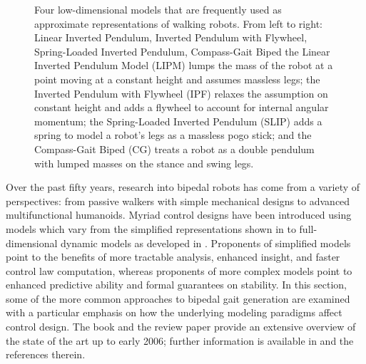 
\begin{figure}
  \centering
  \def\svgwidth{1.0\columnwidth}
  
  \caption{Four low-dimensional models that are frequently used as approximate
    representations of walking robots. From left to right:
    Linear Inverted Pendulum, Inverted Pendulum with Flywheel, Spring-Loaded
    Inverted Pendulum, Compass-Gait Biped
    the Linear Inverted Pendulum Model (LIPM) lumps the mass of the robot at a
    point moving at a constant height and assumes massless legs;
    the Inverted Pendulum with Flywheel (IPF) relaxes the assumption on constant
    height and adds a flywheel to account for internal angular momentum;
    the Spring-Loaded Inverted Pendulum (SLIP) adds a spring to model a robot's
    legs as a massless pogo stick;
    and the Compass-Gait Biped (CG) treats a robot as a double pendulum with
    lumped masses on the stance and swing legs.}
  \label{fig:biped-models}
\end{figure}

Over the past fifty years, research into bipedal robots has come from a variety of perspectives: from passive walkers with simple mechanical designs to advanced multifunctional humanoids.
%
Myriad control designs have been introduced using models which vary from the simplified representations shown in  to full-dimensional dynamic models as developed in .
%
Proponents of simplified models point to the benefits of more tractable analysis, enhanced insight, and faster control law computation, whereas proponents of more complex models point to enhanced predictive ability and formal guarantees on stability.
%
In this section, some of the more common approaches to bipedal gait generation are examined with a particular emphasis on how the underlying modeling paradigms affect control design.
%
The book \cite{Westervelt2007} and the review paper \cite{Hurmuzlu2004} provide an extensive overview of the state of the art up to early 2006; further information is available in \cite{Full1999,Holmes2006,Wisse2007,Kuo2007,Siciliano2008,Chevallereau2009,Sadati2012} and the references therein.


